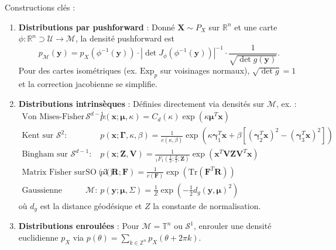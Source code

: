 \documentclass[11pt,a4paper]{article}
\begin{document}
Constructions clés :

\begin{enumerate}
    \item \textbf{Distributions par pushforward} : Donné $\mathbf{X} \sim P_X$ sur $\mathbb{R}^n$ et une carte $\phi: \mathbb{R}^n \supset \mathcal{U} \to \mathcal{M}$, la densité pushforward est
    \begin{equation}
        p_{\mathcal{M}}(\mathbf{y}) = p_X(\phi^{-1}(\mathbf{y})) \cdot |\det J_\phi(\phi^{-1}(\mathbf{y}))|^{-1} \cdot \frac{1}{\sqrt{\det g(\mathbf{y})}}.
    \end{equation}
    Pour des cartes isométriques (ex. $\text{Exp}_p$ sur voisinages normaux), $\sqrt{\det g} = 1$ et la correction jacobienne se simplifie.

    \item \textbf{Distributions intrinsèques} : Définies directement via densités sur $\mathcal{M}$, ex. :
    \begin{align}
        \text{Von Mises-Fisher sur } \mathcal{S}^{d-1}: &\quad p(\mathbf{x}; \boldsymbol{\mu}, \kappa) = C_d(\kappa) \exp(\kappa \boldsymbol{\mu}^T \mathbf{x}) \\
        \text{Kent sur } \mathcal{S}^2: &\quad p(\mathbf{x}; \boldsymbol{\Gamma}, \kappa, \beta) = \frac{1}{c(\kappa, \beta)} \exp(\kappa \boldsymbol{\gamma}_1^T \mathbf{x} + \beta[(\boldsymbol{\gamma}_2^T \mathbf{x})^2 - (\boldsymbol{\gamma}_3^T \mathbf{x})^2]) \\
        \text{Bingham sur } \mathcal{S}^{d-1}: &\quad p(\mathbf{x}; \mathbf{Z}, \mathbf{V}) = \frac{1}{{}_1F_1(\frac{1}{2}; \frac{d}{2}; \mathbf{Z})} \exp(\mathbf{x}^T \mathbf{V} \mathbf{Z} \mathbf{V}^T \mathbf{x}) \\
        \text{Matrix Fisher sur } \text{SO}(3): &\quad p(\mathbf{R}; \mathbf{F}) = \frac{1}{c(\mathbf{F})} \exp(\text{Tr}(\mathbf{F}^T \mathbf{R})) \\
        \text{Gaussienne riemannienne sur } \mathcal{M}: &\quad p(\mathbf{y}; \boldsymbol{\mu}, \Sigma) = \frac{1}{Z} \exp\left(-\frac{1}{2} d_g(\mathbf{y}, \boldsymbol{\mu})^2\right)
    \end{align}
    où $d_g$ est la distance géodésique et $Z$ la constante de normalisation.

    \item \textbf{Distributions enroulées} : Pour $\mathcal{M} = \mathbb{T}^n$ ou $\mathcal{S}^1$, enrouler une densité euclidienne $p_X$ via $p(\theta) = \sum_{k \in \mathbb{Z}^n} p_X(\theta + 2\pi k)$.
\end{enumerate}
\end{document}
